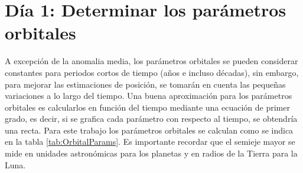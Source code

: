 \documentclass[a4paper,10pt]{article}
\begin{document}
\section{Día 1: Determinar los parámetros orbitales}
A excepción de la anomalia media, los parámetros orbitales se pueden considerar constantes para periodos cortos de tiempo (años e incluso décadas), sin embargo, para mejorar las estimaciones de posición, se tomarán en cuenta las pequeñas variaciones a lo largo del tiempo. Una buena aproximación para los parámetros orbitales es calcularlos en función del tiempo mediante una ecuación de primer grado, es decir, si se grafica cada parámetro con respecto al tiempo, se obtendría una recta. Para este trabajo los parámetros orbitales se calculan como se indica en la tabla \ref{tab:OrbitalParams}. Es importante recordar que el semieje mayor se mide en unidades astronómicas para los planetas y en radios de la Tierra para la Luna. 
\end{document}

